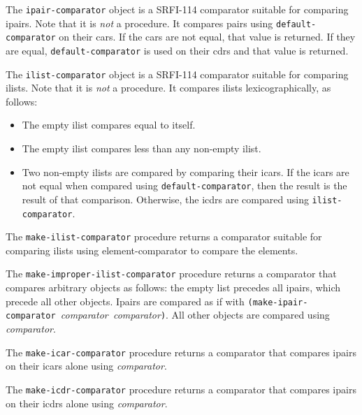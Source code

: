 \begin{description}
\tightlist
\item[ \href{}{} \texttt{ipair-comparator} ]
The \texttt{ipair-comparator} object is a SRFI-114 comparator suitable
for comparing ipairs. Note that it is \emph{not} a procedure. It
compares pairs using \texttt{default-comparator} on their cars. If the
cars are not equal, that value is returned. If they are equal,
\texttt{default-comparator} is used on their cdrs and that value is
returned.
\item[ \href{}{} \texttt{ilist-comparator} ]
The \texttt{ilist-comparator} object is a SRFI-114 comparator suitable
for comparing ilists. Note that it is \emph{not} a procedure. It
compares ilists lexicographically, as follows:

\begin{itemize}
\tightlist
\item
  The empty ilist compares equal to itself.
\item
  The empty ilist compares less than any non-empty ilist.
\item
  Two non-empty ilists are compared by comparing their icars. If the
  icars are not equal when compared using \texttt{default-comparator},
  then the result is the result of that comparison. Otherwise, the icdrs
  are compared using \texttt{ilist-comparator}.
\end{itemize}
\item[ \href{}{} \texttt{make-ilist-comparator} comparator
-\textgreater{} comparator ]
The \texttt{make-ilist-comparator} procedure returns a comparator
suitable for comparing ilists using element-comparator to compare the
elements.
\item[ \href{}{} \texttt{make-improper-ilist-comparator} comparator
-\textgreater{} comparator ]
The \texttt{make-improper-ilist-comparator} procedure returns a
comparator that compares arbitrary objects as follows: the empty list
precedes all ipairs, which precede all other objects. Ipairs are
compared as if with
\texttt{(make-ipair-comparator\ }\emph{comparator}\texttt{\ }\emph{comparator}\texttt{)}.
All other objects are compared using \emph{comparator}.
\item[ \href{}{} \texttt{make-icar-comparator} comparator
-\textgreater{} comparator ]
The \texttt{make-icar-comparator} procedure returns a comparator that
compares ipairs on their icars alone using \emph{comparator}.
\item[ \href{}{} \texttt{make-icdr-comparator} comparator
-\textgreater{} comparator ]
The \texttt{make-icdr-comparator} procedure returns a comparator that
compares ipairs on their icdrs alone using \emph{comparator}.
\end{description}

